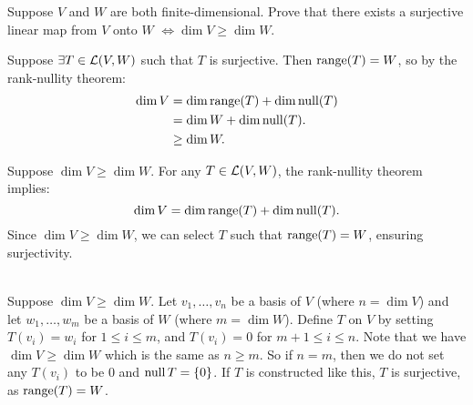 \begin{xrcs}
  Suppose $V$ and $W$ are both finite-dimensional. Prove that there exists a surjective linear map from $V$ onto $W$
  $
    \iff \dim V \geq \dim W.
  $
\end{xrcs}
\begin{prf}
  \Rightarrowdirection Suppose $\exists T \in \mathcal{L}(V,W)$ such that $T$ is surjective. Then $\operatorname{range}(T) = W$, so by the rank-nullity theorem:
  \begin{equation}
    \begin{aligned}
      \dim V &=    \dim \operatorname{range}(T) + \dim \operatorname{null}(T) \\
             &=    \dim W + \dim \operatorname{null}(T). \\
             &\geq \dim W.
    \end{aligned}
  \end{equation}

  \Leftarrowdirection Suppose $\dim V \geq \dim W$. For any $T \in \mathcal{L}(V,W)$, the rank-nullity theorem implies:
  \begin{equation}
    \dim V = \dim \operatorname{range}(T) + \dim \operatorname{null}(T).
  \end{equation}
  Since $\dim V \geq \dim W$, we can select $T$ such that $\operatorname{range}(T) = W$, ensuring surjectivity.

   \\
  Suppose $\dim V \geq \dim W$. Let $v_1, \dots, v_n$ be a basis of $V$ (where $n = \dim V$) and let $w_1, \dots, w_m$ be a basis of $W$ (where $m = \dim W$).  Define $T$ on $V$ by setting $T(v_i) = w_i$ for $1 \leq i \leq m$, and $T(v_i) = 0$ for $m+1 \leq i \leq n$. Note that we have $\dim V \geq \dim W$ which is the same as $n \geq m$. So if $n = m$, then we do not set any $T(v_i)$ to be $0$ and $\operatorname{null} T = \{0\}$. If $T$ is constructed like this, $T$ is surjective, as $\operatorname{range}(T) = W$.
\end{prf}

